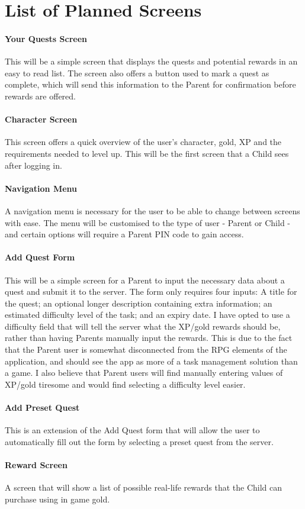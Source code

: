\chapter{List of Planned Screens}
\label{appendix:screens}

\subsubsection{Your Quests Screen}
This will be a simple screen that displays the quests and potential rewards in an easy to read list.
The screen also offers a button used to mark a quest as complete, which will send this information to the Parent for confirmation before rewards are offered.

\subsubsection{Character Screen}
This screen offers a quick overview of the user's character, gold, XP and the requirements needed to level up.
This will be the first screen that a Child sees after logging in.

\subsubsection{Navigation Menu}
A navigation menu is necessary for the user to be able to change between screens with ease.
The menu will be customised to the type of user - Parent or Child - and certain options will require a Parent PIN code to gain access. 

\subsubsection{Add Quest Form}
This will be a simple screen for a Parent to input the necessary data about a quest and submit it to the server. 
The form only requires four inputs: A title for the quest; an optional longer description containing extra information; an estimated difficulty level of the task; and an expiry date.
I have opted to use a difficulty field that will tell the server what the XP/gold rewards should be, rather than having Parents manually input the rewards.
This is due to the fact that the Parent user is somewhat disconnected from the RPG elements of the application, and should see the app as more of a task management solution than a game.
I also believe that Parent users will find manually entering values of XP/gold tiresome and would find selecting a difficulty level easier. 

\subsubsection{Add Preset Quest}
This is an extension of the Add Quest form that will allow the user to automatically fill out the form by selecting a preset quest from the server.

\subsubsection{Reward Screen}
A screen that will show a list of possible real-life rewards that the Child can purchase using in game gold.